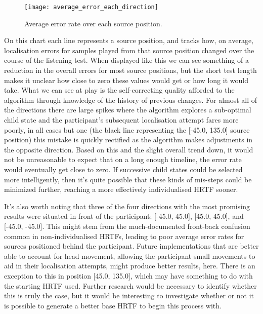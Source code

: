 \begin{figure}
	\caption{Average error rate over each source position.}
	\centering
		\texttt{[image: average\_error\_each\_direction]}
	
\end{figure}

On this chart each line represents a source position, and tracks how, on average, localisation errors for samples played from that source position changed over the course of the listening test. When displayed like this we can see something of a reduction in the overall errors for most source positions, but the short test length makes it unclear how close to zero these values would get or how long it would take. What we can see at play is the self-correcting quality afforded to the algorithm through knowledge of the history of previous changes. For almost all of the directions there are large spikes where the algorithm explores a sub-optimal child state and the participant's subsequent localisation attempt fares more poorly, in all cases but one (the black line representing the [-45.0, 135.0] source position) this mistake is quickly rectified as the algorithm makes adjustments in the opposite direction. Based on this and the slight overall trend down, it would not be unreasonable to expect that on a long enough timeline, the error rate would eventually get close to zero. If successive child states could be selected more intelligently, then it's quite possible that these kinds of mis-steps could be minimized further, reaching a more effectively individualised HRTF sooner.

It's also worth noting that three of the four directions with the most promising results were situated in front of the participant: [-45.0, 45.0], [45.0, 45.0], and [-45.0, -45.0]. This might stem from the much-documented front-back confusion common in non-individualised HRTFs, leading to poor average error rates for sources positioned behind the participant. Future implementations that are better able to account for head movement, allowing the participant small movements to aid in their localisation attempts, might produce better results, here. There is an exception to this in position [45.0, 135.0], which may have something to do with the starting HRTF used. Further research would be necessary to identify whether this is truly the case, but it would be interesting to investigate whether or not it is possible to generate a better base HRTF to begin this process with.

